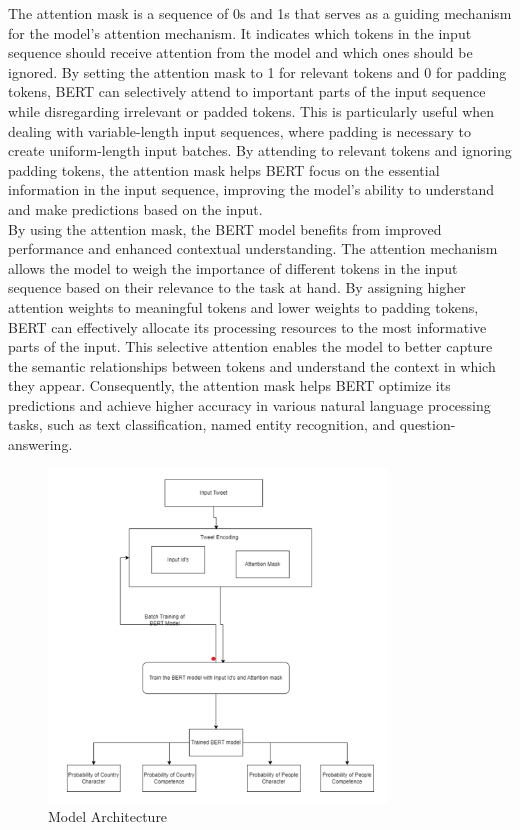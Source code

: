 \documentclass[conference]{IEEEtran}
\begin{document}
	The attention mask is a sequence of 0s and 1s that serves as a guiding mechanism for the model's attention mechanism. It indicates which tokens in the input sequence should receive attention from the model and which ones should be ignored. By setting the attention mask to 1 for relevant tokens and 0 for padding tokens, BERT can selectively attend to important parts of the input sequence while disregarding irrelevant or padded tokens. This is particularly useful when dealing with variable-length input sequences, where padding is necessary to create uniform-length input batches. By attending to relevant tokens and ignoring padding tokens, the attention mask helps BERT focus on the essential information in the input sequence, improving the model's ability to understand and make predictions based on the input.\\

	By using the attention mask, the BERT model benefits from improved performance and enhanced contextual understanding. The attention mechanism allows the model to weigh the importance of different tokens in the input sequence based on their relevance to the task at hand. By assigning higher attention weights to meaningful tokens and lower weights to padding tokens, BERT can effectively allocate its processing resources to the most informative parts of the input. This selective attention enables the model to better capture the semantic relationships between tokens and understand the context in which they appear. Consequently, the attention mask helps BERT optimize its predictions and achieve higher accuracy in various natural language processing tasks, such as text classification, named entity recognition, and question-answering.\\
	
\begin{figure}[h]
\centering
 \includegraphics[width=9cm]{BERT_Flow}
 \caption{Model Architecture}
 \end{figure}
\end{document}
